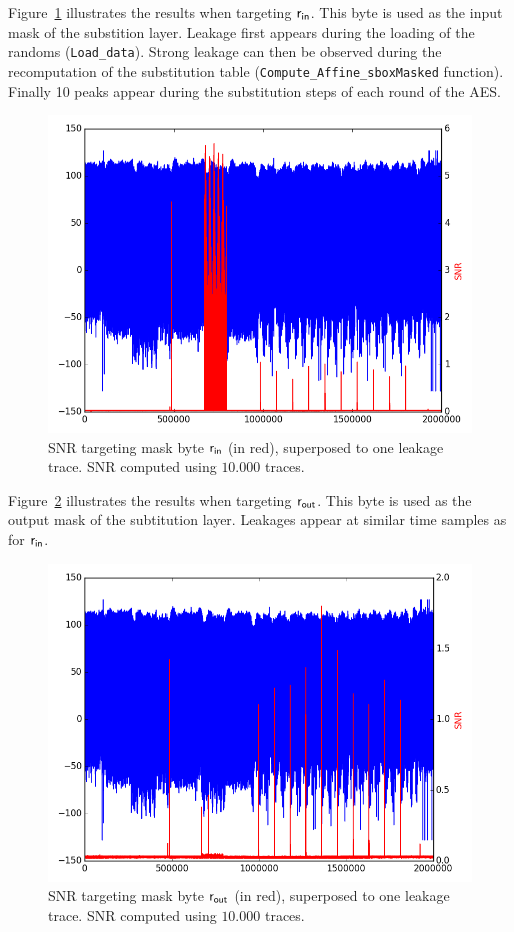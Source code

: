 Figure~\ref{fig:SNR_rin} illustrates the results when targeting $\mathsf{r_{in}}$. This byte is used as the input mask of the substition layer. 
Leakage first appears during the loading of the randoms (\texttt{Load\_data}).
Strong leakage can then be observed during the recomputation of the substitution table (\texttt{Compute\_Affine\_sboxMasked} function).
Finally 10 peaks appear during the substitution steps of each round of the AES.
\begin{figure}[H]
	\centering 
	\includegraphics[scale=0.35]{figures/2Mpts/SNR_M16_10ktraces.png}
	\caption{SNR targeting mask byte $\mathsf{r_{in}} $ (in red), superposed to one leakage trace. SNR computed using $10.000$ traces.}
	\label{fig:SNR_rin}
\end{figure}

Figure~\ref{fig:SNR_beta} illustrates the results when targeting $\mathsf{r_{out}}$. This byte is used as the output mask of the subtitution layer. 
Leakages appear at similar time samples as for $\mathsf{r_{in}}$.
\begin{figure}[H]
	\centering 
	\includegraphics[scale=0.35]{figures/2Mpts/SNR_M17_10ktraces.png}
	\caption{SNR targeting mask byte $\mathsf{r_{out}}$ (in red), superposed to one leakage trace. SNR computed using $10.000$ traces.}
	\label{fig:SNR_beta}
\end{figure}

